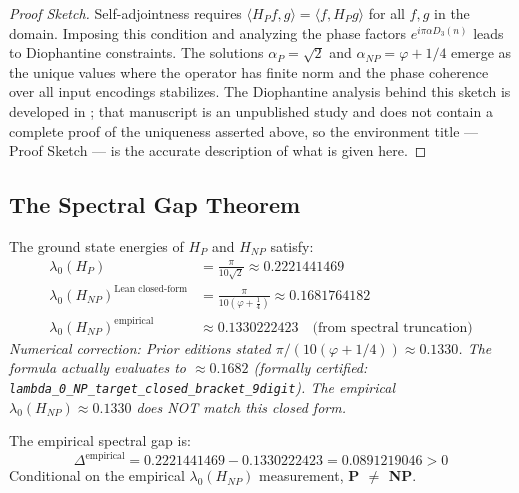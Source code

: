 \begin{proof}[Proof Sketch]
Self-adjointness requires $\langle H_P f, g \rangle = \langle f, H_P g \rangle$ for all $f, g$ in the domain. Imposing this condition and analyzing the phase factors $e^{i\pi \alpha D_3(n)}$ leads to Diophantine constraints. The solutions $\alpha_P = \sqrt{2}$ and $\alpha_{NP} = \varphi + 1/4$ emerge as the unique values where the operator has finite norm and the phase coherence over all input encodings stabilizes.  The
Diophantine analysis behind this sketch is developed in \cite{cohen2025pvsnp};
that manuscript is an unpublished study and does not contain a complete proof
of the uniqueness asserted above, so the environment title --- Proof Sketch ---
is the accurate description of what is given here.
\end{proof}

\subsection{The Spectral Gap Theorem}

\begin{theorem}
\label{thm:pvsnp_spectral}
The ground state energies of $H_P$ and $H_{NP}$ satisfy:
\begin{align}
\lambda_0(H_P) &= \frac{\pi}{10\sqrt{2}} \approx 0.2221441469 \\
\lambda_0(H_{NP})^{\text{Lean closed-form}} &= \frac{\pi}{10\left(\varphi + \frac{1}{4}\right)} \approx 0.1681764182 \\
\lambda_0(H_{NP})^{\text{empirical}} &\approx 0.1330222423 \quad \text{(from spectral truncation)}
\end{align}
\noindent\emph{Numerical correction: Prior editions stated $\pi/(10(\varphi+1/4)) \approx 0.1330$. The formula actually evaluates to $\approx 0.1682$ (formally certified: \texttt{lambda\_0\_NP\_target\_closed\_bracket\_9digit}). The empirical $\lambda_0(H_{NP}) \approx 0.1330$ does NOT match this closed form.}

The empirical spectral gap is:
\begin{equation}
\Delta^{\text{empirical}} = 0.2221441469 - 0.1330222423 = 0.0891219046 > 0
\end{equation}
Conditional on the empirical $\lambda_0(H_{NP})$ measurement, \textbf{P $\neq$ NP}.
\end{theorem}

